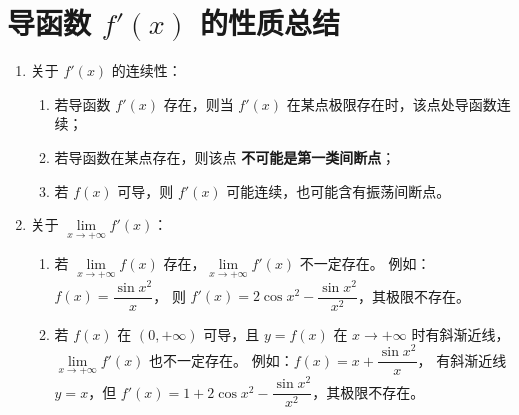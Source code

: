 \section{导函数 $f'(x)$ 的性质总结}
\DTwoOne

\begin{enumerate}
    \item 关于 $f'(x)$ 的连续性：
          \begin{enumerate}
              \item 若导函数 $f'(x)$ 存在，则当 $f'(x)$ 在某点极限存在时，该点处导函数连续；
              \item 若导函数在某点存在，则该点 \textbf{不可能是第一类间断点}；
              \item 若 $f(x)$ 可导，则 $f'(x)$ 可能连续，也可能含有振荡间断点。
          \end{enumerate}

    \item 关于 $\lim\limits_{x\to+\infty} f'(x)$：
          \begin{enumerate}
              \item 若 $\lim\limits_{x\to+\infty} f(x)$ 存在，$\lim\limits_{x\to+\infty} f'(x)$ 不一定存在。
                    例如：$f(x)=\dfrac{\sin x^2}{x}$，
                    则 $f'(x)=2\cos x^2 - \dfrac{\sin x^2}{x^2}$，其极限不存在。
              \item 若 $f(x)$ 在 $(0,+\infty)$ 可导，且 $y=f(x)$ 在 $x\to+\infty$ 时有斜渐近线，
                    $\lim\limits_{x\to+\infty} f'(x)$ 也不一定存在。
                    例如：$f(x)=x+\dfrac{\sin x^2}{x}$，
                    有斜渐近线 $y=x$，但 $f'(x)=1+2\cos x^2-\dfrac{\sin x^2}{x^2}$，其极限不存在。
          \end{enumerate}
\end{enumerate}

